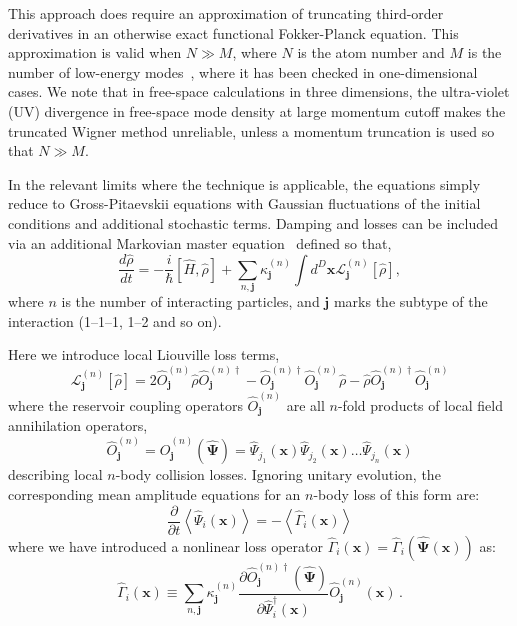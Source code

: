 \documentclass[aps,prl,twocolumn,showpacs,amsmath,amssymb,superscriptaddress]{revtex4-1}
\newcommand{\xvec}{\boldsymbol{x}}
\newcommand{\jvec}{\boldsymbol{j}}
\newcommand{\Psivec}{\boldsymbol{\Psi}}
\begin{document}
This approach does require an approximation of truncating third-order derivatives
in an otherwise exact functional Fokker-Planck equation.
This approximation is valid when $N \gg M$, where $N$ is the atom number and
$M$ is the number of low-energy modes~\cite{Drummond1993,Sinatra2002,Norrie2006},
where it has been checked in one-dimensional cases.
We note that in free-space calculations in three dimensions,
the ultra-violet (UV) divergence in free-space mode density at large momentum cutoff
makes the truncated Wigner method unreliable,
unless a momentum truncation is used so that $N \gg M$.

In the relevant limits where the technique is applicable,
the equations simply reduce to Gross-Pitaevskii equations with Gaussian fluctuations
of the initial conditions and additional stochastic terms.
Damping and losses can be included via an additional Markovian master equation~\cite{Jack2002}
defined so that,
\begin{equation}
	\frac{d\hat{\rho}}{dt} = -\frac{i}{\hbar} \left[ \hat{H}, \hat{\rho} \right] +
	\sum_{n,\jvec} \kappa_{\jvec}^{(n)}
	\int d^D\xvec \mathcal{L}_{\jvec}^{(n)} \left[ \hat{\rho} \right],
\end{equation}
where $n$ is the number of interacting particles,
and $\jvec$ marks the subtype of the interaction (1--1--1, 1--2 and so on).

Here we introduce local Liouville loss terms,
\begin{equation}
	\mathcal{L}_{\jvec}^{(n)} \left[ \hat{\rho}\right] =
	2 \hat{O}_{\jvec}^{(n)} \hat{\rho}\hat{O}_{\jvec}^{(n)\dagger} -
	\hat{O}_{\jvec}^{(n)\dagger}\hat{O}_{\jvec}^{(n)}\hat{\rho} -
	\hat{\rho}\hat{O}_{\jvec}^{(n)\dagger}\hat{O}_{\jvec}^{(n)}
\end{equation}
where the reservoir coupling operators $\hat{O}_{\jvec}^{(n)}$
are all $n$-fold products of local field annihilation operators,
\begin{equation}
	\hat{O}_{\jvec}^{(n)} =
	\hat{O}_{\jvec}^{(n)} \left( \widehat{\Psivec} \right) =
	\widehat{\Psi}_{j_{1}} \left( \xvec \right)
	\widehat{\Psi}_{j_{2}} \left( \xvec \right) \ldots
	\widehat{\Psi}_{j_{n}} \left( \xvec \right)
\end{equation}
describing local $n$-body collision losses.
Ignoring unitary evolution, the corresponding mean amplitude equations
for an $n$-body loss of this form are:
\begin{equation}
	\frac{\partial}{\partial t} \left\langle
		\widehat{\Psi}_{i} \left( \xvec \right)
	\right\rangle =
	-\left\langle \hat{\Gamma}_{i} \left( \xvec \right) \right\rangle
\end{equation}
where we have introduced a nonlinear loss operator $\hat{\Gamma}_{i} \left( \xvec \right) =
\hat{\Gamma}_{i} \left( \widehat{\Psivec} \left( \xvec \right) \right)$ as:
\begin{equation}
	\hat{\Gamma}_{i} \left( \xvec \right) \equiv
	\sum_{n,\jvec} \kappa_{\jvec}^{(n)}
	\frac{\partial\hat{O}_{\jvec}^{(n)\dagger}	\left( \widehat{\Psivec} \right)}
		{\partial \hat{\Psi}_{i}^{\dagger} \left( \xvec \right)}
	\hat{O}_{\jvec}^{(n)} \left( \xvec \right) \,.
\end{equation}
\end{document}
